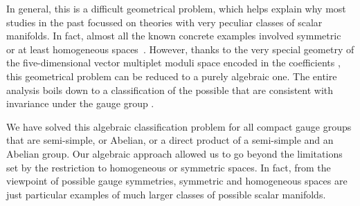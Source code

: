 \documentclass[a4paper,11pt]{article}
\providecommand{\ti}{\ensuremath{\tilde{I}}}
\providecommand{\tj}{\ensuremath{\tilde{J}}}
\providecommand{\tk}{\ensuremath{\tilde{K}}}
\begin{document}
In general, this is a difficult geometrical problem, which helps explain
why most studies in the past focussed on theories with very peculiar
classes of scalar manifolds. In fact, almost all the known concrete
examples involved symmetric~\cite{GST1,GST2,GST3,dWvP1,GZ1} or at least
homogeneous spaces~\cite{dWvP2,GZ1}. However, thanks to the very special
geometry of the five-dimensional vector multiplet moduli space encoded in
the coefficients \myHighlight{$C_{\ti\tj\tk}$}\coordHE{}, this geometrical problem can be reduced
to a purely algebraic one.  The entire analysis boils down to a
classification of the possible \myHighlight{$C_{\ti\tj\tk}$}\coordHE{} that are consistent with
invariance under the  gauge group \coordHE{}. 

We have solved this algebraic classification problem for all compact gauge
groups that are semi-simple, or Abelian, or a direct product of a
semi-simple and an Abelian group. Our algebraic approach allowed us to go
beyond the limitations set by the restriction to homogeneous or symmetric
spaces. In fact, from the viewpoint of possible gauge symmetries,
symmetric and homogeneous spaces are just particular examples of much
larger classes of possible scalar manifolds. 
\end{document}
